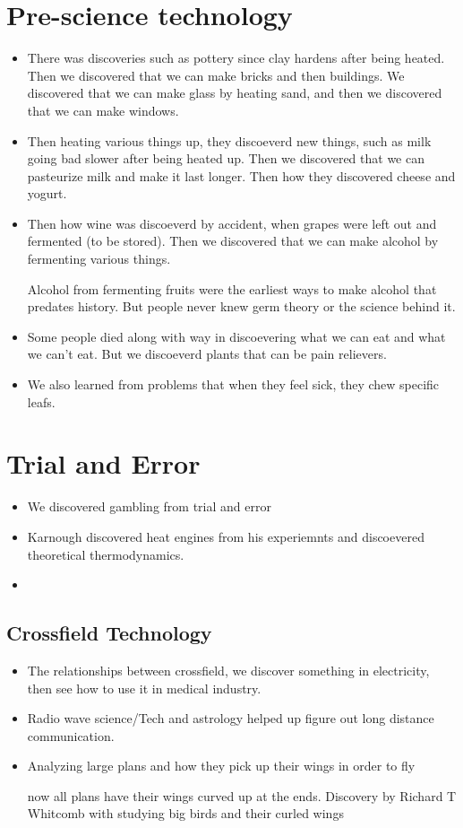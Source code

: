 \documentclass{article}
\begin{document}
\section*{Pre-science technology}
\begin{itemize}
  \item There was discoveries such as pottery since clay hardens after being heated.
    Then we discovered that we can make bricks and then buildings.
    We discovered that we can make glass by heating sand, and then
    we discovered that we can make windows.
  \item Then heating various things up, they discoeverd new things,
    such as milk going bad slower after being heated up.
    Then we discovered that we can pasteurize milk and make it last longer.
    Then how they discovered cheese and yogurt.
  \item Then how wine was discoeverd by accident, when grapes were left out
    and fermented (to be stored). Then we discovered that we can make alcohol by fermenting
    various things.

    Alcohol from fermenting fruits were the earliest ways to make alcohol that
    predates history. But people never knew germ theory or the science behind it.

    \item Some people died along with way in discoevering what we can eat and what we can't eat.
    But we discoeverd plants that can be pain relievers.

  \item We also learned from problems that when they feel sick,
    they chew specific leafs.
\end{itemize}

\section*{Trial and Error}
\begin{itemize}
  \item We discovered gambling from trial and error
  \item Karnough discovered heat engines from his experiemnts and discoevered
    theoretical thermodynamics.
  \item
\end{itemize}
\subsection{Crossfield Technology}
\begin{itemize}
  \item The relationships between crossfield, we discover something
    in electricity, then see how to use it in medical industry.
  \item Radio wave science/Tech and astrology helped up figure out
    long distance communication.
  \item Analyzing large plans and how they pick up their wings in order to fly

    now all plans have their wings curved up at the ends. Discovery
    by Richard T Whitcomb with studying big birds and their curled wings
\end{itemize}
\end{document}
